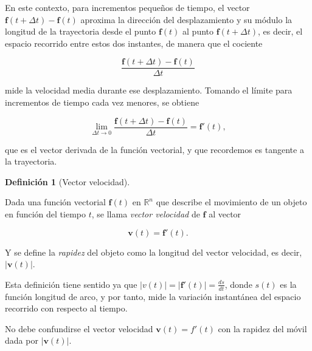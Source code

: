 \documentclass[
  a4paper,
]{scrreport}
\theoremstyle{definition}
\theoremstyle{plain}
\theoremstyle{definition}
\newtheorem{definition}{Definición}[chapter]
\theoremstyle{definition}
\theoremstyle{plain}
\theoremstyle{plain}
\theoremstyle{remark}
\begin{document}
En este contexto, para incrementos pequeños de tiempo, el vector
\(\mathbf{f}(t+\Delta t)-\mathbf{f}(t)\) aproxima la dirección del
desplazamiento y su módulo la longitud de la trayectoria desde el punto
\(\mathbf{f}(t)\) al punto \(\mathbf{f}(t+\Delta t)\), es decir, el
espacio recorrido entre estos dos instantes, de manera que el cociente

\[
\frac{\mathbf{f}(t+\Delta t)-\mathbf{f}(t)}{\Delta t}
\]

mide la velocidad media durante ese desplazamiento. Tomando el límite
para incrementos de tiempo cada vez menores, se obtiene

\[
\lim_{\Delta t\to 0} \frac{\mathbf{f}(t+\Delta t)-\mathbf{f}(t)}{\Delta t} = \mathbf{f}'(t),
\]

que es el vector derivada de la función vectorial, y que recordemos es
tangente a la trayectoria.

\begin{definition}[Vector
velocidad]\protect\hypertarget{def-vector-velocidad-funcion-vectorial}{}\label{def-vector-velocidad-funcion-vectorial}

Dada una función vectorial \(\mathbf{f}(t)\) en \(\mathbb{R}^n\) que
describe el movimiento de un objeto en función del tiempo \(t\), se
llama \emph{vector velocidad} de \(\mathbf{f}\) al vector

\[
\mathbf{v}(t) = \mathbf{f}'(t).
\]

Y se define la \emph{rapidez} del objeto como la longitud del vector
velocidad, es decir, \(|\mathbf{v}(t)|\).

\end{definition}

Esta definición tiene sentido ya que
\(|v(t)| = |\mathbf{f}'(t)| = \frac{ds}{dt}\), donde \(s(t)\) es la
función longitud de arco, y por tanto, mide la variación instantánea del
espacio recorrido con respecto al tiempo.

\begin{tcolorbox}[enhanced jigsaw, leftrule=.75mm, colbacktitle=quarto-callout-warning-color!10!white, toprule=.15mm, opacityback=0, opacitybacktitle=0.6, toptitle=1mm, breakable, bottomtitle=1mm, colframe=quarto-callout-warning-color-frame, rightrule=.15mm, titlerule=0mm, title=\textcolor{quarto-callout-warning-color}{\faExclamationTriangle}\hspace{0.5em}{Advertencia}, arc=.35mm, left=2mm, bottomrule=.15mm, colback=white, coltitle=black]

No debe confundirse el vector velocidad \(\mathbf{v}(t)=f'(t)\) con la
rapidez del móvil dada por \(|\mathbf{v}(t)|\).

\end{tcolorbox}
\end{document}
